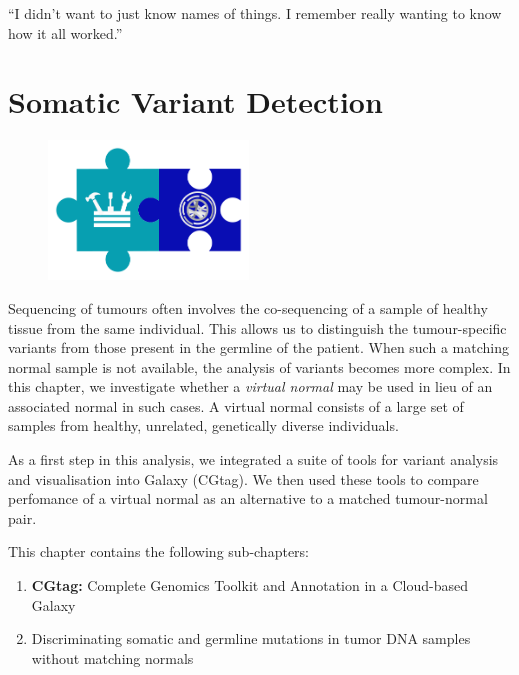 \cleartorightpage
\begin{savequote}[75mm]
“I didn’t want to just know names of things. I remember really wanting to know how it all worked.”
\end{savequote}

\chapter{Somatic Variant Detection}\label{chapter:virtualnormal}
\setcounter{figure}{-1}
\setcounter{table}{-1}
\setcounter{section}{-1}

\begin{figure}[t!]
\includegraphics[height=10em]{frontmatter/images/chapter-header-variants-tools.png}
\end{figure}
\setcounter{figure}{-1}
\setcounter{table}{-1}
\setcounter{section}{-1}


Sequencing of tumours often involves the co-sequencing of a sample of healthy tissue from the same individual. This allows us to distinguish the tumour-specific variants from those present in the germline of the patient. When such a matching normal sample is not available, the analysis of variants becomes more complex. In this chapter, we investigate whether a \emph{virtual normal} may be used in lieu of an associated normal in such cases. A virtual normal consists of a large set of samples from healthy, unrelated, genetically diverse individuals.

As a first step in this analysis, we integrated a suite of tools for variant analysis and visualisation into Galaxy (CGtag). We then used these tools to compare perfomance of a virtual normal as an alternative to a matched tumour-normal pair.

This chapter contains the following sub-chapters:

\begin{enumerate}[label=\ref{chapter:virtualnormal}.\arabic*]
\itemsep-0.5em
\setcounter{enumi}{-1}
\item \textbf{CGtag:} Complete Genomics Toolkit and Annotation in a Cloud-based Galaxy
\item Discriminating somatic and germline mutations in tumor DNA samples without matching normals
\end{enumerate}
